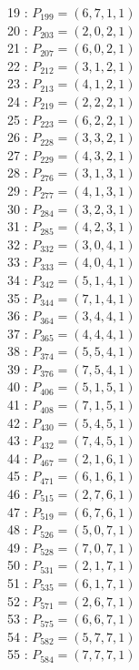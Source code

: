 \documentclass{article}
\begin{document}
{\begin{multicols}{2}
19 : $P_{199}=( 6, 7, 1, 1 )$\\
20 : $P_{203}=( 2, 0, 2, 1 )$\\
21 : $P_{207}=( 6, 0, 2, 1 )$\\
22 : $P_{212}=( 3, 1, 2, 1 )$\\
23 : $P_{213}=( 4, 1, 2, 1 )$\\
24 : $P_{219}=( 2, 2, 2, 1 )$\\
25 : $P_{223}=( 6, 2, 2, 1 )$\\
26 : $P_{228}=( 3, 3, 2, 1 )$\\
27 : $P_{229}=( 4, 3, 2, 1 )$\\
28 : $P_{276}=( 3, 1, 3, 1 )$\\
29 : $P_{277}=( 4, 1, 3, 1 )$\\
30 : $P_{284}=( 3, 2, 3, 1 )$\\
31 : $P_{285}=( 4, 2, 3, 1 )$\\
32 : $P_{332}=( 3, 0, 4, 1 )$\\
33 : $P_{333}=( 4, 0, 4, 1 )$\\
34 : $P_{342}=( 5, 1, 4, 1 )$\\
35 : $P_{344}=( 7, 1, 4, 1 )$\\
36 : $P_{364}=( 3, 4, 4, 1 )$\\
37 : $P_{365}=( 4, 4, 4, 1 )$\\
38 : $P_{374}=( 5, 5, 4, 1 )$\\
39 : $P_{376}=( 7, 5, 4, 1 )$\\
40 : $P_{406}=( 5, 1, 5, 1 )$\\
41 : $P_{408}=( 7, 1, 5, 1 )$\\
42 : $P_{430}=( 5, 4, 5, 1 )$\\
43 : $P_{432}=( 7, 4, 5, 1 )$\\
44 : $P_{467}=( 2, 1, 6, 1 )$\\
45 : $P_{471}=( 6, 1, 6, 1 )$\\
46 : $P_{515}=( 2, 7, 6, 1 )$\\
47 : $P_{519}=( 6, 7, 6, 1 )$\\
48 : $P_{526}=( 5, 0, 7, 1 )$\\
49 : $P_{528}=( 7, 0, 7, 1 )$\\
50 : $P_{531}=( 2, 1, 7, 1 )$\\
51 : $P_{535}=( 6, 1, 7, 1 )$\\
52 : $P_{571}=( 2, 6, 7, 1 )$\\
53 : $P_{575}=( 6, 6, 7, 1 )$\\
54 : $P_{582}=( 5, 7, 7, 1 )$\\
55 : $P_{584}=( 7, 7, 7, 1 )$\\
\end{multicols}
}
\end{document}
